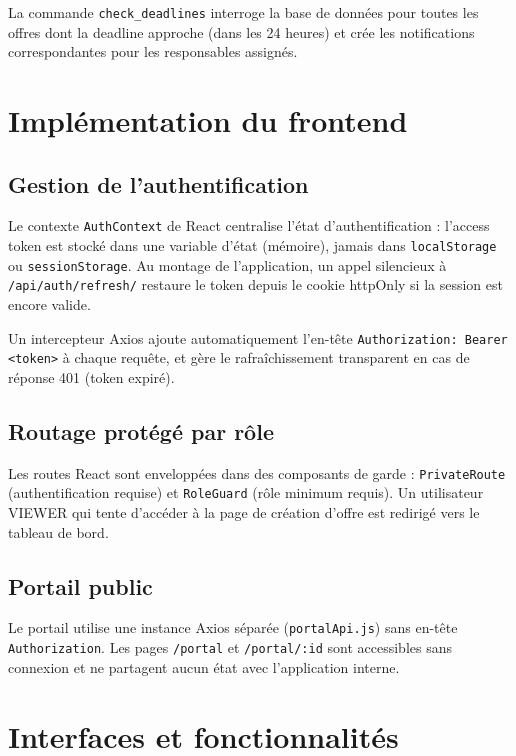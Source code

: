 La commande \texttt{check\_deadlines} interroge la base de données pour toutes les offres dont la deadline approche (dans les 24 heures) et crée les notifications correspondantes pour les responsables assignés.

\section{Implémentation du frontend}

\subsection{Gestion de l'authentification}

Le contexte \texttt{AuthContext} de React centralise l'état d'authentification : l'access token est stocké dans une variable d'état (mémoire), jamais dans \texttt{localStorage} ou \texttt{sessionStorage}. Au montage de l'application, un appel silencieux à \texttt{/api/auth/refresh/} restaure le token depuis le cookie httpOnly si la session est encore valide.

Un intercepteur Axios ajoute automatiquement l'en-tête \texttt{Authorization: Bearer <token>} à chaque requête, et gère le rafraîchissement transparent en cas de réponse 401 (token expiré).

\subsection{Routage protégé par rôle}

Les routes React sont enveloppées dans des composants de garde : \texttt{PrivateRoute} (authentification requise) et \texttt{RoleGuard} (rôle minimum requis). Un utilisateur VIEWER qui tente d'accéder à la page de création d'offre est redirigé vers le tableau de bord.

\subsection{Portail public}

Le portail utilise une instance Axios séparée (\texttt{portalApi.js}) sans en-tête \texttt{Authorization}. Les pages \texttt{/portal} et \texttt{/portal/:id} sont accessibles sans connexion et ne partagent aucun état avec l'application interne.

\section{Interfaces et fonctionnalités}

